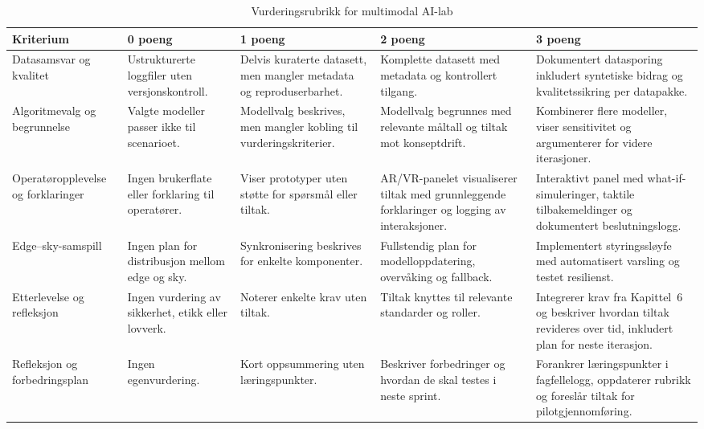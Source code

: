 \begin{table}[htbp]
    \centering
    \caption{Vurderingsrubrikk for multimodal AI-lab}
    \label{tab:rubrikk-ai-lab}
    \begin{tabular}{p{3.2cm}p{3.2cm}p{3.2cm}p{3.2cm}p{3.2cm}}
        \toprule
        \textbf{Kriterium} & \textbf{0 poeng} & \textbf{1 poeng} & \textbf{2 poeng} & \textbf{3 poeng} \\
        \midrule
        Datasamsvar og kvalitet & Ustrukturerte loggfiler uten versjonskontroll. & Delvis kuraterte datasett, men mangler metadata og reproduserbarhet. & Komplette datasett med metadata og kontrollert tilgang. & Dokumentert datasporing inkludert syntetiske bidrag og kvalitetssikring per datapakke. \\
        \addlinespace
        Algoritmevalg og begrunnelse & Valgte modeller passer ikke til scenarioet. & Modellvalg beskrives, men mangler kobling til vurderingskriterier. & Modellvalg begrunnes med relevante måltall og tiltak mot konseptdrift. & Kombinerer flere modeller, viser sensitivitet og argumenterer for videre iterasjoner. \\
        \addlinespace
        Operatøropplevelse og forklaringer & Ingen brukerflate eller forklaring til operatører. & Viser prototyper uten støtte for spørsmål eller tiltak. & AR/VR-panelet visualiserer tiltak med grunnleggende forklaringer og logging av interaksjoner. & Interaktivt panel med what-if-simuleringer, taktile tilbakemeldinger og dokumentert beslutningslogg. \\
        \addlinespace
        Edge--sky-samspill & Ingen plan for distribusjon mellom edge og sky. & Synkronisering beskrives for enkelte komponenter. & Fullstendig plan for modelloppdatering, overvåking og fallback. & Implementert styringssløyfe med automatisert varsling og testet resilienst. \\
        \addlinespace
        Etterlevelse og refleksjon & Ingen vurdering av sikkerhet, etikk eller lovverk. & Noterer enkelte krav uten tiltak. & Tiltak knyttes til relevante standarder og roller. & Integrerer krav fra Kapittel~6 og beskriver hvordan tiltak revideres over tid, inkludert plan for neste iterasjon. \\
        \addlinespace
        Refleksjon og forbedringsplan & Ingen egenvurdering. & Kort oppsummering uten læringspunkter. & Beskriver forbedringer og hvordan de skal testes i neste sprint. & Forankrer læringspunkter i fagfellelogg, oppdaterer rubrikk og foreslår tiltak for pilotgjennomføring. \\
        \bottomrule
    \end{tabular}
\end{table}


